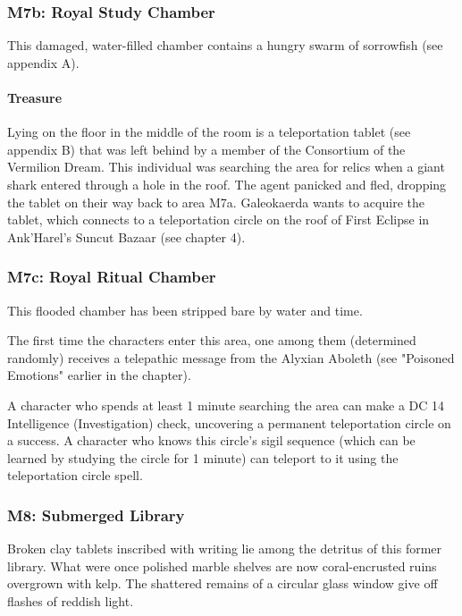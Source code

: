 \documentclass[10pt,a4paper,twoside,twocolumn,openany,nodeprecatedcode]{dndbook}
\begin{document}
\subsubsection{M7b: Royal Study Chamber}
This damaged, water-filled chamber contains a hungry swarm of sorrowfish (see appendix A).

\paragraph{Treasure}
Lying on the floor in the middle of the room is a teleportation tablet (see appendix B) that was left behind by a member of the Consortium of the Vermilion Dream. This individual was searching the area for relics when a giant shark entered through a hole in the roof. The agent panicked and fled, dropping the tablet on their way back to area M7a. Galeokaerda wants to acquire the tablet, which connects to a teleportation circle on the roof of First Eclipse in Ank'Harel's Suncut Bazaar (see chapter 4).

\subsubsection{M7c: Royal Ritual Chamber}
This flooded chamber has been stripped bare by water and time.

The first time the characters enter this area, one among them (determined randomly) receives a telepathic message from the Alyxian Aboleth (see "Poisoned Emotions" earlier in the chapter).

A character who spends at least 1 minute searching the area can make a DC 14 Intelligence (Investigation) check, uncovering a permanent teleportation circle on a success. A character who knows this circle's sigil sequence (which can be learned by studying the circle for 1 minute) can teleport to it using the teleportation circle spell.

\subsubsection{M8: Submerged Library}
\begin{DndReadAloud}{}
Broken clay tablets inscribed with writing lie among the detritus of this former library. What were once polished marble shelves are now coral-encrusted ruins overgrown with kelp. The shattered remains of a circular glass window give off flashes of reddish light.

\end{DndReadAloud}
\end{document}
